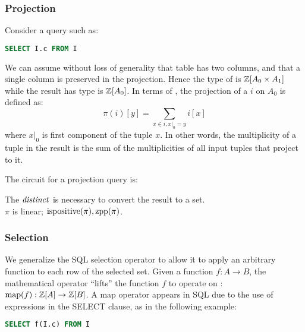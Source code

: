 \subsubsection{Projection}
Consider a query such as:

\begin{lstlisting}[language=SQL]
SELECT I.c FROM I
\end{lstlisting}

We can assume without loss of generality that table  has two columns, and that 
a single column is preserved in the projection.
Hence the type of  is $\mathbb{Z}[A_0 \times A_1]$ while the result has type is $\mathbb{Z}[A_0]$.
In terms of \zrs, the projection of a \zr $i$ on $A_0$ is defined as: $$\pi(i)[y] = 
\sum_{x \in i, x|_0 = y} i[x]$$
\noindent where $x|_0$ is first component of the tuple $x$.
In other words, the multiplicity of a tuple in the result is the sum 
of the multiplicities of all input tuples that project to it.

The circuit for a projection query is:

\begin{center}
\end{center}

The $\mathit{distinct}$ is necessary to convert the result to a set.\\
$\pi$ is linear; $\mbox{ispositive}(\pi), \mbox{zpp}(\pi)$.

\subsubsection{Selection}

We generalize the SQL selection operator to allow it to apply an arbitrary function to each row of the
selected set.
Given a function $f : A \rightarrow B$, the mathematical  operator ``lifts'' the
function $f$ to operate on \zrs: $\mbox{map}(f) : \mathbb{Z}[A] \rightarrow \mathbb{Z}[B]$.  A map operator
appears in SQL due to the use of expressions in the SELECT clause, as in the following example:

\begin{lstlisting}[language=SQL]
SELECT f(I.c) FROM I
\end{lstlisting}

